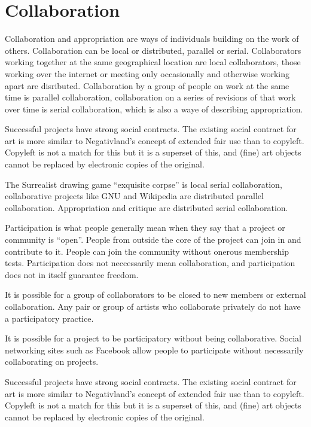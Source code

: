 \documentclass[11pt, a4]{article}
\let\footnote=\endnote
\begin{document}
\section{Collaboration}

Collaboration and appropriation are ways of individuals building on the work of others. Collaboration can be local or distributed, parallel or serial. Collaborators working together at the same geographical location are local collaborators, those working over the internet or meeting only occasionally and otherwise working apart are disributed. Collaboration by a group of people on work at the same time is parallel collaboration, collaboration on a series of revisions of that work over time is serial collaboration, which is also a waye of describing appropriation.

Successful projects have strong social contracts. The existing social contract for art is more similar to Negativland's concept of extended fair use\cite{Negativland2005} than to copyleft. Copyleft is not a match for this but it is a superset of this, and (fine) art objects cannot be replaced by electronic copies of the original. 

The Surrealist drawing game ``exquisite corpse'' is local serial collaboration, collaborative projects like GNU and Wikipedia are distributed parallel collaboration. Appropriation and critique are distributed serial collaboration. 

Participation is what people generally mean when they say that a project or community is ``open''. People from outside the core of the project can join in and contribute to it. People can join the community without onerous membership tests. Participation does not neccessarily mean collaboration, and participation does not in itself guarantee freedom. 

It is possible for a group of collaborators to be closed to new members or external collaboration. Any pair or group of artists who collaborate privately do not have a participatory practice.

It is possible for a project to be participatory without being collaborative. Social networking sites such as Facebook\footnote{See: \url{http://www.facebook.com/}} allow people to participate without necessarily collaborating on projects.

Successful projects have strong social contracts. The existing social contract for art is more similar to Negativland's concept of extended fair use\cite{Negativland2005} than to copyleft. Copyleft is not a match for this but it is a superset of this, and (fine) art objects cannot be replaced by electronic copies of the original. 
\end{document}
